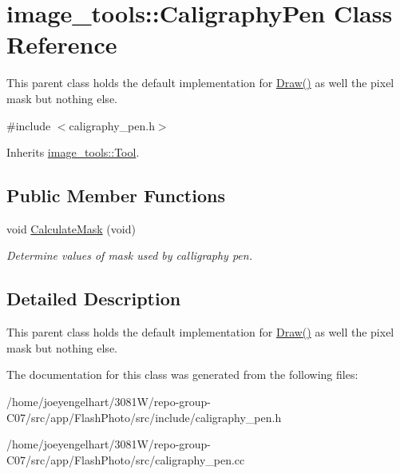 \hypertarget{classimage__tools_1_1CaligraphyPen}{}\section{image\+\_\+tools\+:\+:Caligraphy\+Pen Class Reference}
\label{classimage__tools_1_1CaligraphyPen}


This parent class holds the default implementation for \hyperlink{classimage__tools_1_1Tool_aa5a313769f2a2c5c83b816da81e82bd2}{Draw()} as well the pixel mask but nothing else.  




{\ttfamily \#include $<$caligraphy\+\_\+pen.\+h$>$}



Inherits \hyperlink{classimage__tools_1_1Tool}{image\+\_\+tools\+::\+Tool}.

\subsection*{Public Member Functions}
\begin{DoxyCompactItemize}
\item 
void \hyperlink{classimage__tools_1_1CaligraphyPen_a20dbec7fdb10b84bcccceb1724c078e6}{Calculate\+Mask} (void)\hypertarget{classimage__tools_1_1CaligraphyPen_a20dbec7fdb10b84bcccceb1724c078e6}{}\label{classimage__tools_1_1CaligraphyPen_a20dbec7fdb10b84bcccceb1724c078e6}

\begin{DoxyCompactList}\small\item\em Determine values of mask used by calligraphy pen. \end{DoxyCompactList}\end{DoxyCompactItemize}


\subsection{Detailed Description}
This parent class holds the default implementation for \hyperlink{classimage__tools_1_1Tool_aa5a313769f2a2c5c83b816da81e82bd2}{Draw()} as well the pixel mask but nothing else. 

The documentation for this class was generated from the following files\+:\begin{DoxyCompactItemize}
\item 
/home/joeyengelhart/3081\+W/repo-\/group-\/\+C07/src/app/\+Flash\+Photo/src/include/caligraphy\+\_\+pen.\+h\item 
/home/joeyengelhart/3081\+W/repo-\/group-\/\+C07/src/app/\+Flash\+Photo/src/caligraphy\+\_\+pen.\+cc\end{DoxyCompactItemize}
